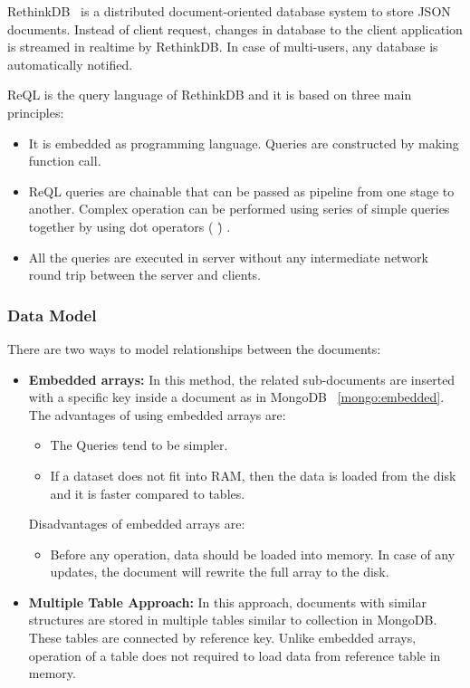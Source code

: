 RethinkDB~\citep{rethinkdb} is a distributed document-oriented database system to store JSON documents. Instead of client request,  changes in database to the client application is streamed in realtime by RethinkDB. In case of multi-users, any database is automatically  notified.
\par
ReQL is the query language  of RethinkDB and it is based on three main principles:
 \begin{itemize}
 \item  It is  embedded  as programming language. Queries are constructed by making function call. 
 \item ReQL queries are chainable that can be passed as pipeline from one stage to another. Complex operation can be performed using series of simple queries together by using dot operators ( \.) . 
 \item All the queries are executed in server without any intermediate network round trip between the server and clients.
 \end{itemize}
  
\subsubsection{Data Model}
There are two ways to model relationships between the documents: 
\begin{itemize}
	\item \textbf{Embedded arrays:} In this method, the related sub-documents are inserted with a specific key inside a document as in MongoDB ~\ref{mongo:embedded}. The advantages of using embedded arrays are:
		\begin{itemize}
			\item The Queries tend to be simpler. 
			\item If a dataset  does not fit into RAM, then the data is loaded  from the disk and it is faster compared to tables. 
		\end{itemize}
		Disadvantages of embedded arrays are: 
		\begin{itemize}
			\item Before any operation, data should be loaded into memory. In case of any updates, the document will rewrite the full array to the disk.
		\end{itemize}
		
	\item 
	\textbf{Multiple Table Approach:} In this approach, documents with similar structures are stored in multiple tables similar to collection in MongoDB. These tables are connected by reference key. Unlike embedded arrays, operation of a table does not required to load data from reference table in memory.
\end{itemize}

